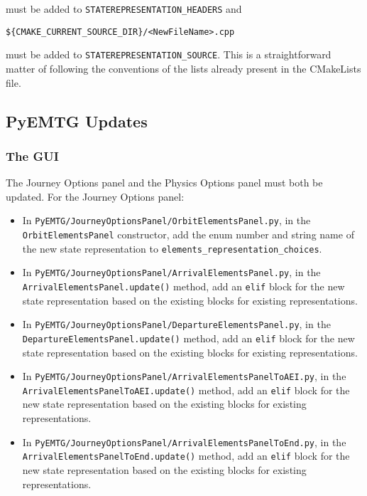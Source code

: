 \documentclass[11pt]{article}
\begin{document}
\noindent must be added to \texttt{STATEREPRESENTATION\_HEADERS} and

\begin{verbatim}
${CMAKE_CURRENT_SOURCE_DIR}/<NewFileName>.cpp
\end{verbatim}

\noindent must be added to \texttt{STATEREPRESENTATION\_SOURCE}. This is a straightforward matter of following the conventions of the lists already present in the CMakeLists file.

\subsection{PyEMTG Updates}
\label{subsec:pyemtgUpdates}

\subsubsection{The GUI}
\label{subsubsec:theGui}

The Journey Options panel and the Physics Options panel must both be updated. For the Journey Options panel:

\begin{itemize}
	\item In \texttt{PyEMTG/JourneyOptionsPanel/OrbitElementsPanel.py}, in the \texttt{OrbitElementsPanel} constructor, add the enum number and string name of the new state representation to \texttt{elements\_representation\_choices}.
	\item In \texttt{PyEMTG/JourneyOptionsPanel/ArrivalElementsPanel.py}, in the \texttt{ArrivalElementsPanel.update()} method, add an \texttt{elif} block for the new state representation based on the existing blocks for existing representations.
	\item In \texttt{PyEMTG/JourneyOptionsPanel/DepartureElementsPanel.py}, in the \texttt{DepartureElementsPanel.update()} method, add an \texttt{elif} block for the new state representation based on the existing blocks for existing representations.
	\item In \texttt{PyEMTG/JourneyOptionsPanel/ArrivalElementsPanelToAEI.py}, in the \texttt{ArrivalElementsPanelToAEI.update()} method, add an \texttt{elif} block for the new state representation based on the existing blocks for existing representations.
	\item In \texttt{PyEMTG/JourneyOptionsPanel/ArrivalElementsPanelToEnd.py}, in the \texttt{ArrivalElementsPanelToEnd.update()} method, add an \texttt{elif} block for the new state representation based on the existing blocks for existing representations.
\end{itemize}
\end{document}
